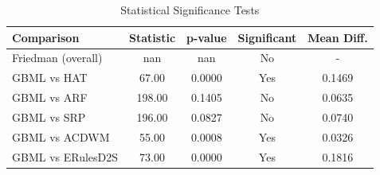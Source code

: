 \begin{table}[htbp]
\centering
\caption{Statistical Significance Tests}
\label{tab:statistical_tests}
\begin{tabular}{lcccc}
\toprule
Comparison & Statistic & p-value & Significant & Mean Diff. \\
\midrule
Friedman (overall) & nan & nan & No & - \\
\midrule
GBML vs HAT & 67.00 & 0.0000 & Yes & 0.1469 \\
GBML vs ARF & 198.00 & 0.1405 & No & 0.0635 \\
GBML vs SRP & 196.00 & 0.0827 & No & 0.0740 \\
GBML vs ACDWM & 55.00 & 0.0008 & Yes & 0.0326 \\
GBML vs ERulesD2S & 73.00 & 0.0000 & Yes & 0.1816 \\
\bottomrule
\end{tabular}
\end{table}